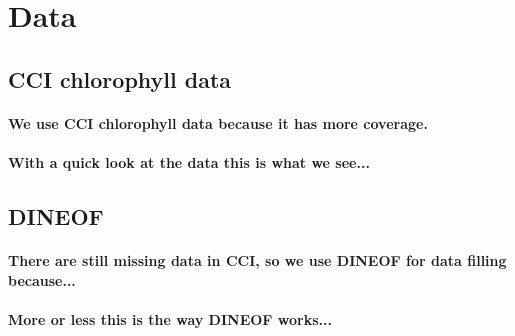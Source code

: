 \newcommand{\cov}{\text{cov}}

\newcommand{\0}{\mathbf{0}}

\newcommand{\C}{\mathbf{C}}
\newcommand{\X}{\mathbf{X}}
\newcommand{\U}{\mathbf{U}}
\renewcommand{\V}{\mathbf{V}}
\newcommand{\M}{\mathbf{M}}
\newcommand{\Q}{\mathbf{Q}}
\renewcommand{\H}{\mathbf{H}}
\newcommand{\I}{\mathbf{I}}
\newcommand{\R}{\mathbf{R}}
\renewcommand{\P}{\mathbf{P}}
\renewcommand{\L}{\mathbf{L}}

\renewcommand{\a}{\mathbf{a}}
\newcommand{\h}{\mathbf{h}}
\renewcommand{\r}{\mathbf{r}}
\newcommand{\x}{\mathbf{x}}
\renewcommand{\k}{\mathbf{k}}
\newcommand{\y}{\mathbf{y}}
\newcommand{\z}{\mathbf{z}}

\newcommand{\SSigma}{\mathbf{\Sigma}}
\newcommand{\GGamma}{\mathbf{\Gamma}}

\newcommand{\ttheta}{\boldsymbol\theta}
\newcommand{\eeta}{\boldsymbol\eta}
\newcommand{\vvarepsilon}{\boldsymbol\varepsilon}
\newcommand{\xxi}{\boldsymbol\xi}
\newcommand{\mmu}{\boldsymbol\mu}

\section{Data}

\subsection{CCI chlorophyll data}

\paragraph{We use CCI chlorophyll data because it has more coverage.}

\paragraph{With a quick look at the data this is what we see...}

\subsection{DINEOF}

\paragraph{There are still missing data in CCI, so we use DINEOF for
data filling because...}

\paragraph{More or less this is the way DINEOF works...}

